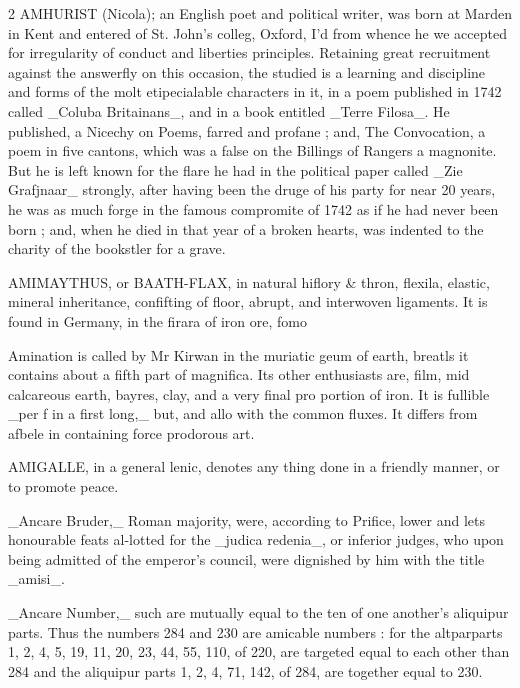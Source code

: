 \documentclass[10pt]{article}
\begin{document}
\begin{multicols}{2}
AMHURIST (Nicola); an English poet and political writer, was born at Marden in Kent and entered of St. John's colleg, Oxford, I’d from whence he we accepted for irregularity of conduct and liberties principles. Retaining great recruitment against the answerfly on this occasion, the studied is a learning and discipline and forms of the molt etipecialable characters in it, in a poem published in 1742 called \_Coluba Britainans\_, and in a book entitled \_Terre Filosa\_. He published, a Nicechy on Poems, farred and profane ; and, The Convocation, a poem in five cantons, which was a false on the Billings of Rangers a magnonite. But he is left known for the flare he had in the political paper called \_Zie Grafjnaar\_ strongly, after having been the druge of his party for near 20 years, he was as much forge in the famous compromite of 1742 as if he had never been born ; and, when he died in that year of a broken hearts, was indented to the charity of the bookstler for a grave.

AMIMAYTHUS, or BAATH-FLAX, in natural hiflory \& thron, flexila, elastic, mineral inheritance, confifting of floor, abrupt, and interwoven ligaments. It is found in Germany, in the firara of iron ore, fomo

Amination is called by Mr Kirwan in the muriatic geum of earth, breatls it contains about a fifth part of magnifica. Its other enthusiasts are, film, mid calcareous earth, bayres, clay, and a very final pro portion of iron. It is fullible \_per f in a first long,\_ but, and allo with the common fluxes. It differs from afbele in containing force prodorous art.

AMIGALLE, in a general lenic, denotes any thing done in a friendly manner, or to promote peace.

\_Ancare Bruder,\_ Roman majority, were, according to Prifice, lower and lets honourable feats al-lotted for the \_judica redenia\_, or inferior judges, who upon being admitted of the emperor's council, were dignished by him with the title \_amisi\_.

\_Ancare Number,\_ such are mutually equal to the ten of one another’s aliquipur parts. Thus the numbers 284 and 230 are amicable numbers : for the altparparts 1, 2, 4, 5, 19, 11, 20, 23, 44, 55, 110, of 220, are targeted equal to each other than 284 \textdaggerdbl{} and the aliquipur parts 1, 2, 4, 71, 142, of 284, are together equal to 230.


\end{multicols}
\end{document}
